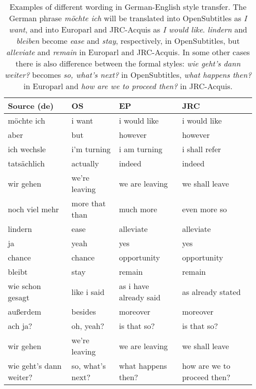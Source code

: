 \documentclass[11pt,a4paper]{article}
\begin{document}
\begin{table}[]
\small
\centering
\begin{tabular}{|p{1.5cm}|p{1.5cm}|p{1.5cm}|p{1.5cm}|}
\hline
\textbf{Source (de)}      & \textbf{OS}             & \textbf{EP}                     & \textbf{JRC}               \\ \hline
m{\"o}chte ich       & i want         & i would like           & i would like      \\ \hline
aber             & but            & however                & however           \\ \hline
ich wechsle      & i'm turning    & i am turning           & i shall refer     \\ \hline
tats{\"a}chlich      & actually       & indeed                 & indeed            \\ \hline
wir gehen        & we're leaving  & we are leaving         & we shall leave    \\ \hline
noch viel mehr   & more that than & much more              & even more so      \\ \hline
lindern          & ease           & alleviate              & alleviate         \\ \hline
ja               & yeah           & yes                    & yes               \\ \hline
chance           & chance         & opportunity            & opportunity       \\ \hline
bleibt           & stay           & remain                 & remain            \\ \hline
wie schon gesagt & like i said    & as i have already said & as already stated \\ \hline
au{\ss}erdem         & besides        & moreover               & moreover          \\ \hline
ach ja?          & oh, yeah?      & is that so?            & is that so?       \\ \hline
wir gehen          & we're leaving      & we are leaving            & we shall leave       \\ \hline
wie geht's dann weiter?          & so, what's next?      & what happens then?            & how are we to proceed then?       \\ \hline
\end{tabular}
\caption{\small Examples of different wording in German-English style transfer. The German phrase \textit{m{\"o}chte ich} will be translated into OpenSubtitles as \textit{I want}, and into Europarl and JRC-Acquis as \textit{I would like}. \textit{lindern} and \textit{bleiben} become \textit{ease} and \textit{stay}, respectively, in OpenSubtitles, but \textit{alleviate} and \textit{remain} in Europarl and JRC-Acquis. In some other cases there is also difference between the formal styles: \textit{wie geht's dann weiter?} becomes \textit{so, what's next?} in OpenSubtitles, \textit{what happens then?} in Europarl and \textit{how are we to proceed then?} in JRC-Acquis.
      }
      \label{tab-deenexamples}
\end{table}
\end{document}
